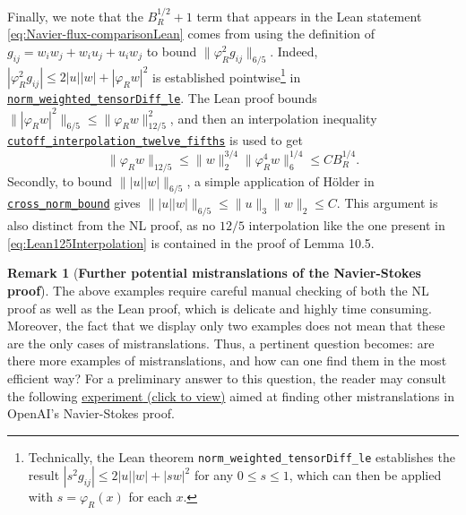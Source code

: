 \documentclass[10pt, a4paper, reqno]{amsart}
\numberwithin{equation}{section}
\renewcommand{\leq}{\leqslant}
\theoremstyle{definition}
\newtheorem{remark}[theorem]{Remark}
\theoremstyle{definition}
\begin{document}
Finally, we note that the $B_R^{1/2} + 1$ term that appears in the Lean statement \eqref{eq:Navier-flux-comparisonLean} comes from using the definition of $g_{ij}=  w_iw_j + w_i u_j + u_i w_j$ to bound $\|\varphi_R^2 g_{ij}\|_{6/5}$. Indeed, $|\varphi_{R}^2 g_{ij}|\leq 2|u||w| +|\varphi_R w|^2$ is established pointwise\footnote{Technically, the Lean theorem \texttt{norm\_weighted\_tensorDiff\_le} establishes the result $|s^2 g_{ij}| \leq 2|u||w| + |sw|^2$ for any $0 \leq s \leq 1$, which can then be applied with $s = \varphi_{R}(x)$ for each $x$.} in \href{https://github.com/openai/NavierStokesAndEuler/blob/f9e8bc5b38b6e212696e8a30e3e91517af887bbd/NavierStokes/R3/LocalizedTensorBounds.lean#L119} {\texttt{norm\_weighted\_tensorDiff\_le}}. The Lean proof bounds $\lVert |\varphi_{R}w|^{2} \rVert_{6/5} \leq \lVert \varphi_{R} w \rVert_{12/5}^{2}$, and then an interpolation inequality \href{https://github.com/openai/NavierStokesAndEuler/blob/f9e8bc5b38b6e212696e8a30e3e91517af887bbd/NavierStokes/R3/WeightedInterpolation.lean#L150-L161}{\texttt{cutoff\_interpolation\_twelve\_fifths}} is used to get \begin{equation} \label{eq:Lean125Interpolation}\|\varphi_R w\|_{12/5} \leq \|w\|_2^{3/4}\|\varphi^4_R w\|_6^{1/4} \leq C B_R^{1/4}.\end{equation} Secondly, to bound $\| |u||w| \|_{6/5}$, a simple application of H\"older in \href{https://github.com/openai/NavierStokesAndEuler/blob/f9e8bc5b38b6e212696e8a30e3e91517af887bbd/NavierStokes/R3/LocalizedTensorBounds.lean#L46}{\texttt{cross\_norm\_bound}} gives $\||u||w| \|_{6/5} \leq \|u\|_3 \|w\|_2 \leq C$. This argument is also distinct from the NL proof, as no $12/5$ interpolation like the one present in \eqref{eq:Lean125Interpolation} is contained in the proof of Lemma 10.5.



\begin{remark}[{\bf Further potential mistranslations of the Navier-Stokes proof}]\label{rem:further}
The above examples require careful manual checking of both the NL proof as well as the Lean proof, which is delicate and highly time consuming. Moreover, the fact that we display only two examples does not mean that these are the only cases of mistranslations. Thus, a pertinent question becomes: are there more examples of mistranslations, and how can one find them in the most efficient way? For a preliminary answer to this question, the reader may consult the following  \href{http://www.damtp.cam.ac.uk/research/afha/anders/Navier-Stokes_Experiment.pdf}{\underline{experiment} (click to view)} aimed at finding other mistranslations in OpenAI's Navier-Stokes proof. 
\end{remark}
\end{document}
